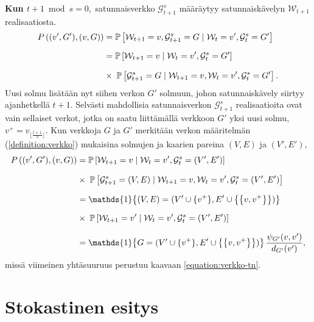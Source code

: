 \documentclass[finnish, 12pt, a4paper, sci, utf8, pdfa]{aaltothesis}
\newcommand{\Grandom}{\mathcal{G}}
\newcommand{\Wrandom}{\mathcal{W}}
\newcommand{\indicator}{\mathopen{\mathds{1}}}
\newcommand*{\prob}{\mathbb{P}}
\begin{document}
{\textbf{Kun $ t + 1 \bmod s = 0, $} satunnaisverkko $ \Grandom^{s}_{t+1} $ määräytyy satunnaiskävelyn $ \Wrandom_{t+1} $ realisaatiosta.
\begin{equation*}
   \setlength{\jot}{10pt}
   \begin{aligned}
   P\left( (v', G'), (v, G) \right) &= \prob \left[ \Wrandom_{t+1} = v, \Grandom^{s}_{t+1} = G \mid \Wrandom_{t} = v', \Grandom^{s}_{t} = G' \right] \\
   &= \prob \left[ \Wrandom_{t+1} = v \mid \Wrandom_{t} = v', \Grandom^{s}_{t} = G' \right] \\
   &\times \; \prob \left[ \Grandom^{s}_{t+1} = G \mid \Wrandom_{t+1} = v, \Wrandom_{t} = v', \Grandom^{s}_{t} = G' \right].
   \end{aligned}
\end{equation*}
Uusi solmu lisätään nyt siihen verkon $ G' $ solmuun, johon satunnaiskävely siirtyy ajanhetkellä $ t + 1 $. Selvästi mahdollisia satunnaisverkon $ \Grandom^{s}_{t+1} $ realisaatioita ovat vain sellaiset verkot, jotka on saatu liittämällä verkkoon $ G' $ yksi uusi solmu, $ v^{+} = v_{\lfloor \frac{t+1}{s} \rfloor} $. Kun verkkoja $ G $ ja $ G' $ merkitään verkon määritelmän (\ref{definition:verkko}) mukaisina solmujen ja kaarien pareina $ (V, E) $ ja $ (V', E') $,
\begin{equation*}
   \setlength{\jot}{10pt}
   \begin{aligned}
   P\left( (v', G'), (v, G) \right) &= \prob \left[ \Wrandom_{t+1} = v \mid \Wrandom_{t} = v', \Grandom^{s}_{t} = (V', E') \right] \\
           &\times \; \prob \left[ \Grandom^{s}_{t+1} = (V, E) \mid \Wrandom_{t+1} = v, \Wrandom_{t} = v', \Grandom^{s}_{t} = (V', E') \right] \\
           &= \indicator \left\{ (V, E) = (V' \cup \{ v^{+} \}, E' \cup \left\{ \left\{ v, v^{+} \right\} \right\}) \right\} \\
           &\times \; \prob \left[ \Wrandom_{t+1} = v' \mid \Wrandom_{t} = v', \Grandom^{s}_{t} = (V', E') \right] \\
           &= \indicator \left\{ G = (V' \cup \{ v^{+} \}, E' \cup \left\{ \left\{ v, v^{+} \right\} \right\}) \right\} \frac{\psi_{G'}(v, v')}{d_{G'}(v')},
   \end{aligned}
\end{equation*}
missä viimeinen yhtäsuuruus perustuu kaavaan \ref{equation:verkko-tn}.
}

\section{Stokastinen esitys}
\end{document}
